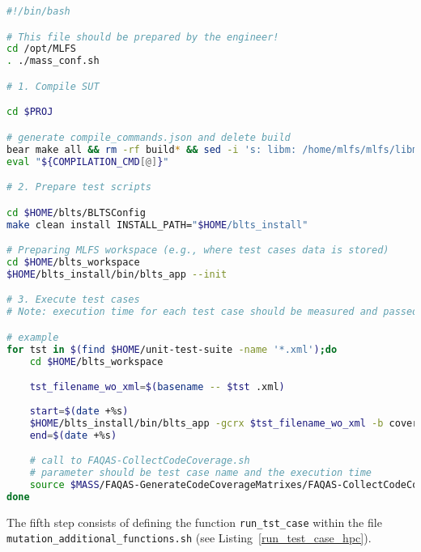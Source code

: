 \begin{lstlisting}[language=bash, label=preparesut_hpc ,caption=\MASS PrepareSUT.sh file.]
#!/bin/bash

# This file should be prepared by the engineer!
cd /opt/MLFS
. ./mass_conf.sh

# 1. Compile SUT

cd $PROJ

# generate compile_commands.json and delete build
bear make all && rm -rf build* && sed -i 's: libm: /home/mlfs/mlfs/libm:' compile_commands.json && mv compile_commands.json $MUTANTS_DIR
eval "${COMPILATION_CMD[@]}"

# 2. Prepare test scripts

cd $HOME/blts/BLTSConfig
make clean install INSTALL_PATH="$HOME/blts_install"

# Preparing MLFS workspace (e.g., where test cases data is stored)
cd $HOME/blts_workspace
$HOME/blts_install/bin/blts_app --init

# 3. Execute test cases
# Note: execution time for each test case should be measured and passed as argument to FAQAS-CollectCodeCoverage.sh

# example
for tst in $(find $HOME/unit-test-suite -name '*.xml');do
    cd $HOME/blts_workspace

    tst_filename_wo_xml=$(basename -- $tst .xml)
    
    start=$(date +%s)
    $HOME/blts_install/bin/blts_app -gcrx $tst_filename_wo_xml -b coverage --nocsv -s $tst
    end=$(date +%s)    

    # call to FAQAS-CollectCodeCoverage.sh
    # parameter should be test case name and the execution time
    source $MASS/FAQAS-GenerateCodeCoverageMatrixes/FAQAS-CollectCodeCoverage.sh $tst_filename_wo_xml "$(($end-$start))"
done
\end{lstlisting}

The fifth step consists of defining the function \texttt{run\_tst\_case} within the file \\\texttt{mutation\_additional\_functions.sh} (see Listing~\ref{run_test_case_hpc}).

